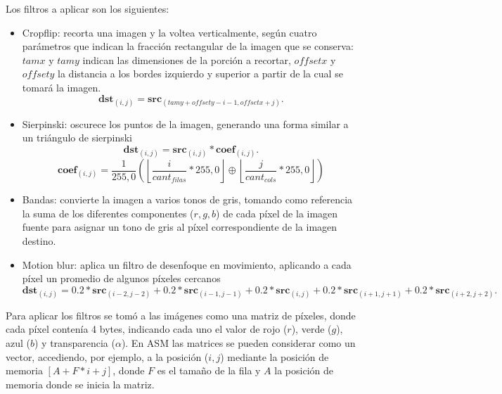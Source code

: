 \documentclass[a4paper]{article}
\begin{document}
Los filtros a aplicar son los siguientes:
\begin{itemize}
\item Cropflip: recorta una imagen y la voltea verticalmente, según cuatro parámetros que indican la fracción rectangular de la imagen que se conserva: $tamx$ y $tamy$ indican las dimensiones de la porción a recortar, $offsetx$ y $offsety$ la distancia a los bordes izquierdo y superior a partir de la cual se tomará la imagen.
\begin{equation}\label{eqn:cropflip}
\textbf{dst}_{(i,j)}=\textbf{src}_{(tamy + offsety - i - 1, offsetx + j)}.
\end{equation}

\item Sierpinski: oscurece los puntos de la imagen, generando una forma similar a un triángulo de sierpinski
\begin{equation}\label{eqn:sierpinski}
\textbf{dst}_{(i,j)}=\textbf{src}_{(i,j)}*\textbf{coef}_{(i,j)}.
\end{equation}
\begin{equation}
\textbf{coef}_{(i,j)}= \frac{1}{255,0}\left (\left \lfloor{\frac{i}{cant_{filas}}*255,0}\right \rfloor \oplus \left \lfloor{\frac{j}{cant_{cols}}*255,0}\right \rfloor \right) 
\end{equation}

\item Bandas: convierte la imagen a varios tonos de gris, tomando como referencia la suma de los diferentes componentes ($r,g,b$) de cada píxel de la imagen fuente para asignar un tono de gris al píxel correspondiente de la imagen destino.

\item Motion blur: aplica un filtro de desenfoque en movimiento, aplicando a cada píxel un promedio de algunos píxeles cercanos
\begin{equation}\label{eqn:mblur}
\textbf{dst}_{(i,j)}=0.2*\textbf{src}_{(i-2,j-2)}+0.2*\textbf{src}_{(i-1,j-1)}+0.2*\textbf{src}_{(i,j)}+0.2*\textbf{src}_{(i+1,j+1)}+0.2*\textbf{src}_{(i+2,j+2)}.
\end{equation}


\end{itemize}

Para aplicar los filtros se tomó a las imágenes como una matriz de píxeles, donde cada píxel contenía 4 bytes, indicando cada uno el valor de rojo ($r$), verde ($g$), azul ($b$) y transparencia ($\alpha$). En ASM las matrices se pueden considerar como un vector, accediendo, por ejemplo, a la posición ($i, j$) mediante la posición de memoria $[A+F*i+j]$, donde $F$ es el tamaño de la fila y $A$ la posición de memoria donde se inicia la matriz.
\end{document}
